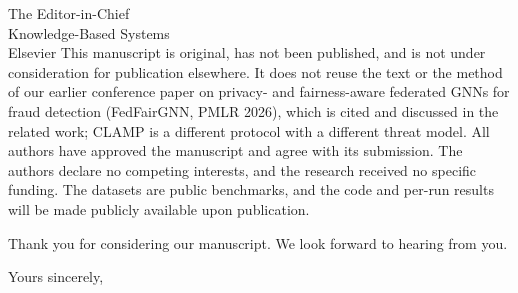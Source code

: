 \documentclass[11pt]{letter}
\begin{document}
\begin{letter}{The Editor-in-Chief\\Knowledge-Based Systems\\Elsevier}
This manuscript is original, has not been published, and is not under consideration for publication elsewhere. It does not reuse the text or the method of our earlier conference paper on privacy- and fairness-aware federated GNNs for fraud detection (FedFairGNN, PMLR 2026), which is cited and discussed in the related work; CLAMP is a different protocol with a different threat model. All authors have approved the manuscript and agree with its submission. The authors declare no competing interests, and the research received no specific funding. The datasets are public benchmarks, and the code and per-run results will be made publicly available upon publication.

Thank you for considering our manuscript. We look forward to hearing from you.

\closing{Yours sincerely,}

\end{letter}
\end{document}
